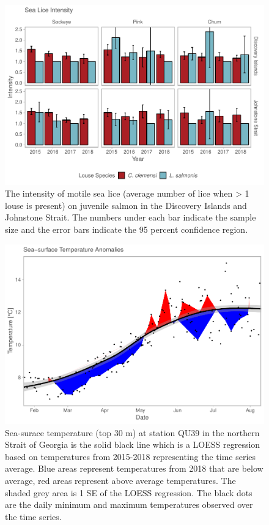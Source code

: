 \documentclass[fleqn,10pt]{wlpeerj} %
\begin{document}
\begin{figure}[H]
\includegraphics[width=0.9\linewidth]{Migration_Observations_Report_files/figure-latex/sealice-intensity-plot-1} \caption{The intensity of motile sea lice (average number of lice when > 1 louse is present) on juvenile salmon in the Discovery Islands and Johnstone Strait. The numbers under each bar indicate the sample size and the error bars indicate the 95 percent confidence region.}\label{fig:sealice-intensity-plot}
\end{figure}

\begin{figure}[H]
\includegraphics[width=0.9\linewidth]{Migration_Observations_Report_files/figure-latex/sst-plot-1} \caption{Sea-surace temperature (top 30 m) at station QU39 in the northern Strait of Georgia is the solid black line which is a LOESS regression based on temperatures from 2015-2018 representing the time series average. Blue areas represent temperatures from 2018 that are below average, red areas represent above average temperatures. The shaded grey area is 1 SE of the LOESS regression. The black dots are the daily minimum and maximum temperatures observed over the time series.}\label{fig:sst-plot}
\end{figure}
\end{document}
